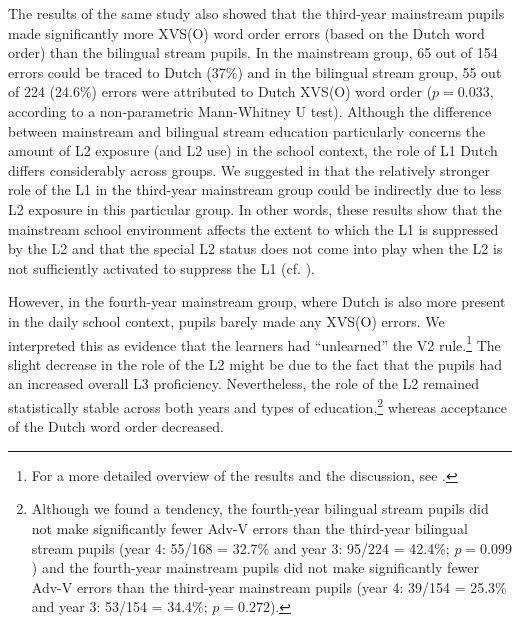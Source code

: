 \documentclass[output=paper]{langsci/langscibook}
\begin{document}
\begin{table}
\caption{Adv-V and V2 errors in fourth-year bilingual (B) stream and mainstream (M) group\label{tab:stadt:3}}
\end{table}

The results of the same study also showed that the third-year mainstream pupils made significantly more XVS(O) word order errors (based on the Dutch word order) than the bilingual stream pupils. In the mainstream group, 65 out of 154 errors could be traced to Dutch (37\%) and in the bilingual stream group, 55 out of 224 (24.6\%) errors were attributed to Dutch XVS(O) word order ($p = 0.033$, according to a non-parametric Mann-Whitney U test). Although the difference between mainstream and bilingual stream education particularly concerns the amount of L2 exposure (and L2 use) in the school context, the role of L1 Dutch differs considerably across groups. We suggested in \citet{StadtEtAl2016, StadtEtAl2018Exposure} that the relatively stronger role of the L1 in the third-year mainstream group could be indirectly due to less L2 exposure in this particular group. In other words, these results show that the mainstream school environment affects the extent to which the L1 is suppressed by the L2 and that the special L2 status does not come into play when the L2 is not sufficiently activated to suppress the L1 (cf. \citealt{Hammarberg2001}).

  However, in the fourth-year mainstream group, where Dutch is also more present in the daily school context, pupils barely made any XVS(O) errors. We interpreted this as evidence that the learners had ``unlearned'' the V2 rule.\footnote{For a more detailed overview of the results and the discussion, see \citet{StadtEtAl2016, StadtEtAl2018Exposure}.} The slight decrease in the role of the L2 might be due to the fact that the pupils had an increased overall L3 proficiency. Nevertheless, the role of the L2 remained statistically stable across both years and types of education,\footnote{Although we found a tendency, the fourth-year bilingual stream pupils did not make significantly fewer Adv-V errors than the third-year bilingual stream pupils (year 4: 55/168 = 32.7\% and year 3: 95/224 = 42.4\%; $p = 0.099$) and the fourth-year mainstream pupils did not make significantly fewer Adv-V errors than the third-year mainstream pupils (year 4: 39/154 = 25.3\% and year 3: 53/154 = 34.4\%; $p = 0.272$).} whereas acceptance of the Dutch word order decreased.
\end{document}
